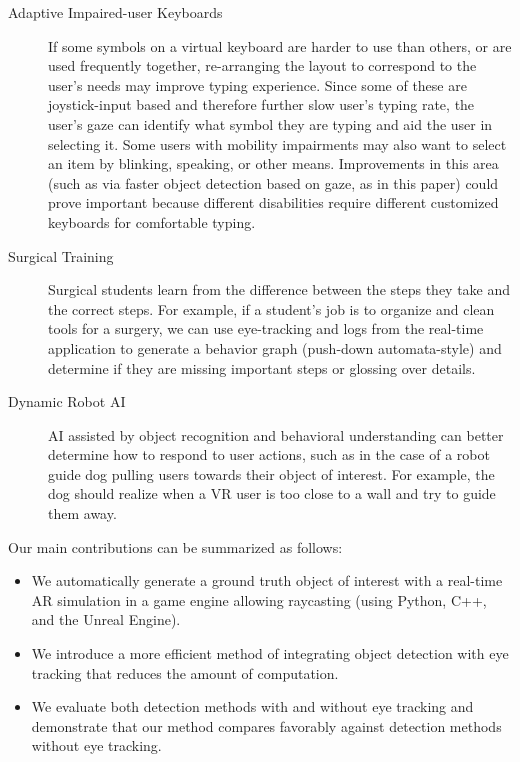\begin{description}
    \item[Adaptive Impaired-user Keyboards]
        If some symbols on a virtual keyboard are harder to use than others, or
        are used frequently together, re-arranging the layout to correspond to
        the user's needs may improve typing experience. Since some of these are
        joystick-input based and therefore further slow user's typing rate, the
        user's gaze can identify what symbol they are typing and aid the user in
        selecting it. Some users with mobility impairments may also want to
        select an item by blinking, speaking, or other means. Improvements in
        this area (such as via faster object detection based on gaze, as in this
        paper) could prove important because different disabilities require
        different customized keyboards for comfortable typing.
    \item[Surgical Training]
        Surgical students learn from the difference between the steps they take
        and the correct steps. For example, if a student's job is to organize
        and clean tools for a surgery, we can use eye-tracking and logs from the
        real-time application to generate a behavior graph (push-down
        automata-style) and determine if they are missing important steps or
        glossing over details.
    \item[Dynamic Robot AI]
        AI assisted by object recognition and behavioral understanding can
        better determine how to respond to user actions, such as in the case of
        a robot guide dog pulling users towards their object of interest. For
        example, the dog should realize when a VR user is too close to a wall
        and try to guide them away.
\end{description}

Our main contributions can be summarized as follows:

\begin{itemize}
    \item
        We automatically generate a ground truth object of interest with a
        real-time AR simulation in a game engine allowing raycasting
        (using Python, C++, and the Unreal Engine).
    \item
        We introduce a more efficient method of integrating object detection
        with eye tracking that reduces the amount of computation.
    \item
        We evaluate both detection methods with and without eye tracking and
        demonstrate that our method compares favorably against detection methods
        without eye tracking.
\end{itemize}
